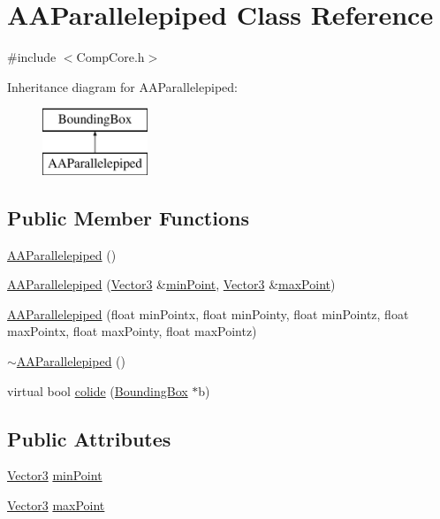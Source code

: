 \hypertarget{class_a_a_parallelepiped}{\section{A\-A\-Parallelepiped Class Reference}
\label{class_a_a_parallelepiped}
}


{\ttfamily \#include $<$Comp\-Core.\-h$>$}

Inheritance diagram for A\-A\-Parallelepiped\-:\begin{figure}[H]
\begin{center}
\leavevmode
\includegraphics[height=2.000000cm]{class_a_a_parallelepiped}
\end{center}
\end{figure}
\subsection*{Public Member Functions}
\begin{DoxyCompactItemize}
\item 
\hyperlink{class_a_a_parallelepiped_acd94b7f295af0d27f89032cd44e0cead}{A\-A\-Parallelepiped} ()
\item 
\hyperlink{class_a_a_parallelepiped_a52a78b0a5253323ea67f2f3eeede75fd}{A\-A\-Parallelepiped} (\hyperlink{struct_vector3}{Vector3} \&\hyperlink{class_a_a_parallelepiped_af680a306612b1cface1885029415dd59}{min\-Point}, \hyperlink{struct_vector3}{Vector3} \&\hyperlink{class_a_a_parallelepiped_a1561fbb24fad0ebc146eec538760f863}{max\-Point})
\item 
\hyperlink{class_a_a_parallelepiped_ab6b717472bfcc5b61d6372850462865b}{A\-A\-Parallelepiped} (float min\-Pointx, float min\-Pointy, float min\-Pointz, float max\-Pointx, float max\-Pointy, float max\-Pointz)
\item 
\hyperlink{class_a_a_parallelepiped_aae402ef71b4e3b5564f5eeadd8b11365}{$\sim$\-A\-A\-Parallelepiped} ()
\item 
virtual bool \hyperlink{class_a_a_parallelepiped_ae553775bfdd16bb088710d5452aed4b4}{colide} (\hyperlink{class_bounding_box}{Bounding\-Box} $\ast$b)
\end{DoxyCompactItemize}
\subsection*{Public Attributes}
\begin{DoxyCompactItemize}
\item 
\hyperlink{struct_vector3}{Vector3} \hyperlink{class_a_a_parallelepiped_af680a306612b1cface1885029415dd59}{min\-Point}
\item 
\hyperlink{struct_vector3}{Vector3} \hyperlink{class_a_a_parallelepiped_a1561fbb24fad0ebc146eec538760f863}{max\-Point}
\end{DoxyCompactItemize}

